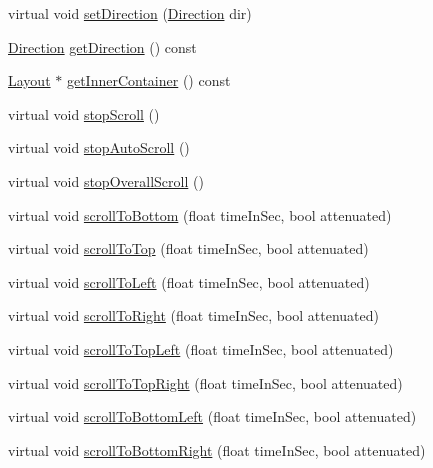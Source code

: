 \begin{DoxyCompactItemize}
virtual void \hyperlink{classui_1_1ScrollView_a397502c59b9161726baa6c99c52e9233}{set\+Direction} (\hyperlink{classui_1_1ScrollView_aed2d778ae8098dcafe323b2beae8dd6b}{Direction} dir)
\item 
\hyperlink{classui_1_1ScrollView_aed2d778ae8098dcafe323b2beae8dd6b}{Direction} \hyperlink{classui_1_1ScrollView_a87326abd42ff586b903b060ab9bc49a2}{get\+Direction} () const
\item 
\hyperlink{classui_1_1Layout}{Layout} $\ast$ \hyperlink{classui_1_1ScrollView_a3f0cd25887319e2ea4b390b27f30dcb2}{get\+Inner\+Container} () const
\item 
virtual void \hyperlink{classui_1_1ScrollView_a6635856a03fd07b49040f2b449536556}{stop\+Scroll} ()
\item 
virtual void \hyperlink{classui_1_1ScrollView_a183ef5bd2ed03ddf55cbedd81d984856}{stop\+Auto\+Scroll} ()
\item 
virtual void \hyperlink{classui_1_1ScrollView_ac62682dffdbd0f1456aef372c13416ac}{stop\+Overall\+Scroll} ()
\item 
virtual void \hyperlink{classui_1_1ScrollView_a8a3f86d2afb79dc39580cf3efd87de19}{scroll\+To\+Bottom} (float time\+In\+Sec, bool attenuated)
\item 
virtual void \hyperlink{classui_1_1ScrollView_a36729cef821e9eb864bfd3e48a279218}{scroll\+To\+Top} (float time\+In\+Sec, bool attenuated)
\item 
virtual void \hyperlink{classui_1_1ScrollView_ab6635faf13dc8b9443bcffb2bffea988}{scroll\+To\+Left} (float time\+In\+Sec, bool attenuated)
\item 
virtual void \hyperlink{classui_1_1ScrollView_ad648164a75360b6138a147fe6e167ce9}{scroll\+To\+Right} (float time\+In\+Sec, bool attenuated)
\item 
virtual void \hyperlink{classui_1_1ScrollView_a2a34bb5914f99b9d9088376744148407}{scroll\+To\+Top\+Left} (float time\+In\+Sec, bool attenuated)
\item 
virtual void \hyperlink{classui_1_1ScrollView_a9993e7d6bc043299c92b61cedef84a1f}{scroll\+To\+Top\+Right} (float time\+In\+Sec, bool attenuated)
\item 
virtual void \hyperlink{classui_1_1ScrollView_a79211c66ee7923a121971ab98a23e391}{scroll\+To\+Bottom\+Left} (float time\+In\+Sec, bool attenuated)
\item 
virtual void \hyperlink{classui_1_1ScrollView_ab76f77e635b16c4aeaa36586d286a7ba}{scroll\+To\+Bottom\+Right} (float time\+In\+Sec, bool attenuated)
\item 

\end{DoxyCompactItemize}
